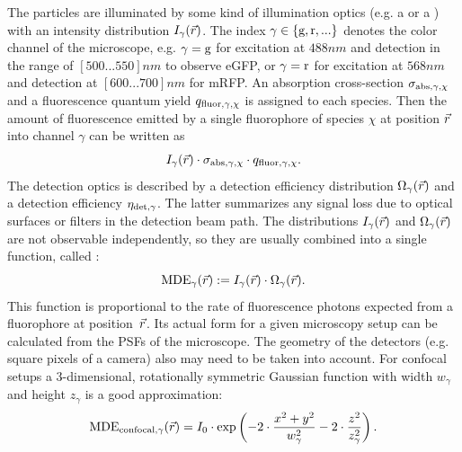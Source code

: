 The particles are illuminated by some kind of illumination optics (e.g. a  or a ) with an intensity distribution $I_\gamma(\vec{r})$. The index $\gamma\in\{{\text{g}},{\text{r}}, ...\}$ denotes the color channel of the microscope, e.g. $\gamma={\text{g}}$ for excitation at $488\unit{nm}$ and detection in the range of $[500...550]\unit{nm}$ to observe eGFP, or $\gamma={\text{r}}$ for excitation at $568\unit{nm}$ and detection at $[600...700]\unit{nm}$ for mRFP. An absorption cross-section $\sigma_{{\text{abs}},\gamma,\chi}$ and a fluorescence quantum yield $q_{{\text{fluor}},\gamma,\chi}$ is assigned to each species. Then the amount of fluorescence emitted by a single fluorophore of species $\chi$ at position $\vec{r}$ into channel $\gamma$ can be written as
  \[ I_\gamma(\vec{r})\cdot\sigma_{{\text{abs}},\gamma,\chi}\cdot q_{{\text{fluor}},\gamma,\chi}. \]
The detection optics is described by a detection efficiency distribution $\Omega_\gamma(\vec{r})$ and a detection efficiency $\eta_{{\text{det}},\gamma}$. The latter summarizes any signal loss due to optical surfaces or filters in the detection beam path. The distributions $I_\gamma(\vec{r})$ and $\Omega_\gamma(\vec{r})$ are not observable independently, so they are usually combined into a single function, called :
\begin{equation}\label{eq:fcstheory_mde}
  \operatorname{MDE}_\gamma(\vec{r}):=I_\gamma(\vec{r})\cdot\Omega_\gamma(\vec{r}).
\end{equation}
This function is proportional to the rate of fluorescence photons expected from a fluorophore at position~$\vec{r}$. Its actual form for a given microscopy setup can be calculated from the PSFs of the microscope. The geometry of the detectors (e.g. square pixels of a camera) also may need to be taken into account. For confocal setups a 3-dimensional, rotationally symmetric Gaussian function with width $w_\gamma$ and height $z_\gamma$ is a good approximation:
\begin{equation}\label{eq:fcstheory_mde_confocal}
  \operatorname{MDE}_{{\text{confocal,}} \gamma}(\vec{r})=I_0\cdot\exp\left(-2\cdot\frac{x^2+y^2}{w_\gamma^2}-2\cdot\frac{z^2}{z_\gamma^2}\right).
\end{equation}



